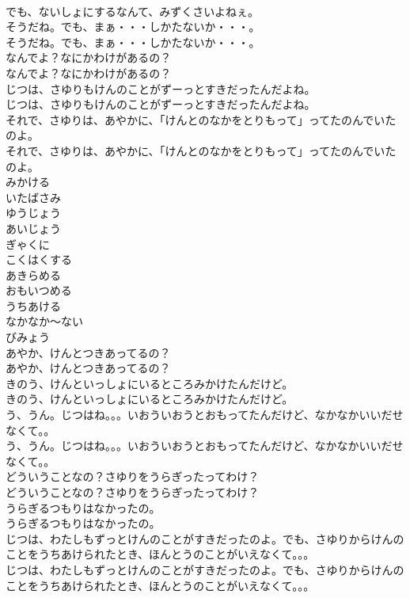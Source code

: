 \documentclass[8pt]{extreport}
\begin{document}
\begin{CJK}{UTF8}{min}
\\	でも、ないしょにするなんて、みずくさいよねぇ。
\\	そうだね。でも、まぁ・・・しかたないか・・・。
\\	そうだね。でも、まぁ・・・しかたないか・・・。
\\	なんでよ？なにかわけがあるの？
\\	なんでよ？なにかわけがあるの？
\\	じつは、さゆりもけんのことがずーっとすきだったんだよね。
\\	じつは、さゆりもけんのことがずーっとすきだったんだよね。
\\	それで、さゆりは、あやかに、「けんとのなかをとりもって」ってたのんでいたのよ。
\\	それで、さゆりは、あやかに、「けんとのなかをとりもって」ってたのんでいたのよ。
\\	みかける
\\	いたばさみ
\\	ゆうじょう
\\	あいじょう
\\	ぎゃくに
\\	こくはくする
\\	あきらめる
\\	おもいつめる
\\	うちあける
\\	なかなか～ない
\\	びみょう
\\	あやか、けんとつきあってるの？
\\	あやか、けんとつきあってるの？
\\	きのう、けんといっしょにいるところみかけたんだけど。
\\	きのう、けんといっしょにいるところみかけたんだけど。
\\	う、うん。じつはね。。。いおういおうとおもってたんだけど、なかなかいいだせなくて。。
\\	う、うん。じつはね。。。いおういおうとおもってたんだけど、なかなかいいだせなくて。。
\\	どういうことなの？さゆりをうらぎったってわけ？
\\	どういうことなの？さゆりをうらぎったってわけ？
\\	うらぎるつもりはなかったの。
\\	うらぎるつもりはなかったの。
\\	じつは、わたしもずっとけんのことがすきだったのよ。でも、さゆりからけんのことをうちあけられたとき、ほんとうのことがいえなくて。。。
\\	じつは、わたしもずっとけんのことがすきだったのよ。でも、さゆりからけんのことをうちあけられたとき、ほんとうのことがいえなくて。。。

\end{CJK}
\end{document}
